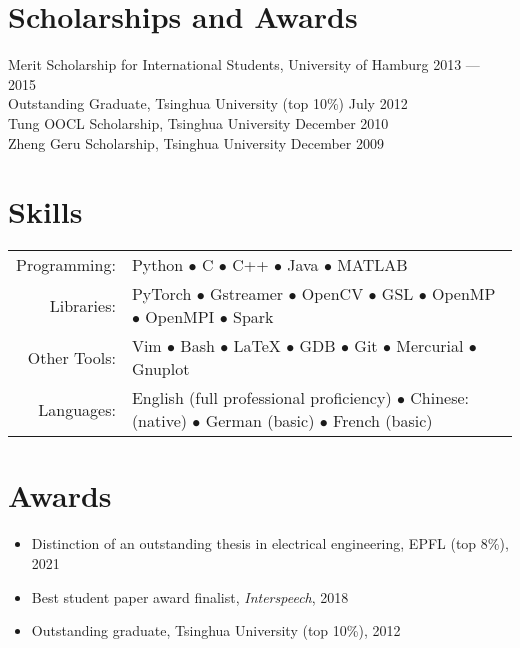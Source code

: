 \documentclass[a4paper,9pt]{extarticle} %
\begin{document}

\section{Scholarships and Awards}

Merit Scholarship for International Students, University of Hamburg \hfill 2013 --- 2015 \\
Outstanding Graduate, Tsinghua University (top 10\%) \hfill July 2012 \\
Tung OOCL Scholarship, Tsinghua University \hfill December 2010  \\
Zheng Geru Scholarship, Tsinghua University \hfill December 2009

\fi


\section{Skills}

\begin{tabular}{rl}
  Programming: & Python $\bullet$ C $\bullet$ C++ $\bullet$ Java $\bullet$ MATLAB \\
  Libraries: & PyTorch $\bullet$ Gstreamer $\bullet$ OpenCV $\bullet$ GSL $\bullet$ OpenMP $\bullet$ OpenMPI $\bullet$ Spark \\
  Other Tools: & Vim $\bullet$ Bash $\bullet$ \LaTeX{} $\bullet$ GDB $\bullet$ Git $\bullet$ Mercurial $\bullet$ Gnuplot \\
  Languages: & English (full professional proficiency) $\bullet$ Chinese: (native) $\bullet$ German (basic) $\bullet$ French (basic) \\
\end{tabular}


\section{Awards}

\begin{itemize}[itemsep=-.9em]
  \item Distinction of an outstanding thesis in electrical engineering, EPFL (top 8\%), 2021
  \item Best student paper award finalist, \textit{Interspeech}, 2018
  \item Outstanding graduate, Tsinghua University (top 10\%), 2012
\end{itemize}
\end{document}
